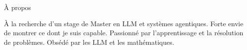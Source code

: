 \begin{rubric}{À propos}
\noentry{~}

\begin{minipage}[t]{\textwidth}
À la recherche d'un stage de Master en LLM et systèmes agentiques. Forte envie de montrer ce dont je suis capable.
Passionné par l'apprentissage et la résolution de problèmes. Obsédé par les LLM et les mathématiques.
\end{minipage}

\end{rubric}

